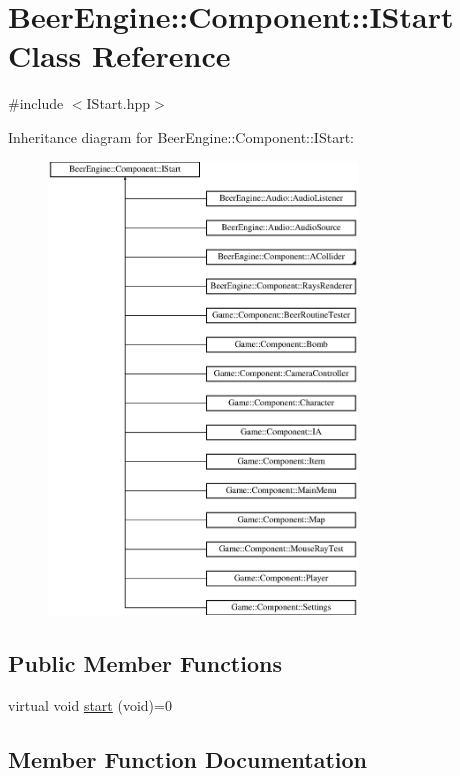 \hypertarget{class_beer_engine_1_1_component_1_1_i_start}{}\section{Beer\+Engine\+:\+:Component\+:\+:I\+Start Class Reference}
\label{class_beer_engine_1_1_component_1_1_i_start}


{\ttfamily \#include $<$I\+Start.\+hpp$>$}

Inheritance diagram for Beer\+Engine\+:\+:Component\+:\+:I\+Start\+:\begin{figure}[H]
\begin{center}
\leavevmode
\includegraphics[height=12.000000cm]{class_beer_engine_1_1_component_1_1_i_start}
\end{center}
\end{figure}
\subsection*{Public Member Functions}
\begin{DoxyCompactItemize}
\item 
virtual void \mbox{\hyperlink{class_beer_engine_1_1_component_1_1_i_start_aa3e25e86e20c46cdaefc6f6d7f21e495}{start}} (void)=0
\end{DoxyCompactItemize}


\subsection{Member Function Documentation}
\mbox{\label{class_beer_engine_1_1_component_1_1_i_start_aa3e25e86e20c46cdaefc6f6d7f21e495}} 
